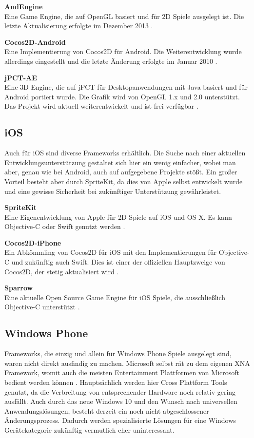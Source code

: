 \bigskip
\textbf{AndEngine}\\
Eine Game Engine, die auf OpenGL basiert und für 2D Spiele ausgelegt ist.
Die letzte Aktualisierung erfolgte im Dezember 2013 \citep{andEngine}.

\bigskip
\textbf{Cocos2D-Android}\\
Eine Implementierung von Cocos2D für Android. Die Weiterentwicklung wurde allerdings eingestellt und die letzte Änderung erfolgte im Januar 2010 \citep{cocos2d_android}.

\bigskip
\textbf{jPCT-AE}\\
Eine 3D Engine, die auf jPCT für Desktopanwendungen mit Java basiert und für Android portiert wurde. Die Grafik wird von OpenGL 1.x und 2.0 unterstützt. Das Projekt wird aktuell weiterentwickelt und ist frei verfügbar \citep{jpct_ae}.


\subsection{iOS}
Auch für iOS sind diverse Frameworks erhältlich. Die Suche nach einer aktuellen Entwicklungsunterstützung gestaltet sich hier ein wenig einfacher, wobei man aber, genau wie bei Android, auch auf aufgegebene Projekte stößt. Ein großer Vorteil besteht aber durch SpriteKit, da dies von Apple selbst entwickelt wurde und eine gewisse Sicherheit bei zukünftiger Unterstützung gewährleistet.

\bigskip
\textbf{SpriteKit}\\
Eine Eigenentwicklung von Apple für 2D Spiele auf iOS und OS X. Es kann Objective-C oder Swift genutzt werden \citep{about_spritekit}.

\bigskip
\textbf{Cocos2D-iPhone}\\
Ein Abkömmling von Cocos2D für iOS mit den Implementierungen für Objective-C und zukünftig auch Swift. Dies ist einer der offiziellen Hauptzweige von Cocos2D, der stetig aktualisiert wird \citep{cocos2d_iphone}.

\bigskip
\textbf{Sparrow}\\
Eine aktuelle Open Source Game Engine für iOS Spiele, die ausschließlich Objective-C unterstützt \citep{sparrow}.


\subsection{Windows Phone}
Frameworks, die einzig und allein für Windows Phone Spiele ausgelegt sind, waren nicht direkt ausfindig zu machen. Microsoft selbst rät zu dem eigenen XNA Framework, womit auch die meisten Entertainment Plattformen von Microsoft bedient werden können \citep{xna}. Hauptsächlich werden hier Cross Plattform Tools genutzt, da die Verbreitung von entsprechender Hardware noch relativ gering ausfällt. Auch durch das neue Windows 10 und den Wunsch nach universellen Anwendungslösungen, besteht derzeit ein noch nicht abgeschlossener Änderungsprozess. Dadurch werden spezialisierte Lösungen für eine Windows Gerätekategorie zukünftig vermutlich eher uninteressant.

